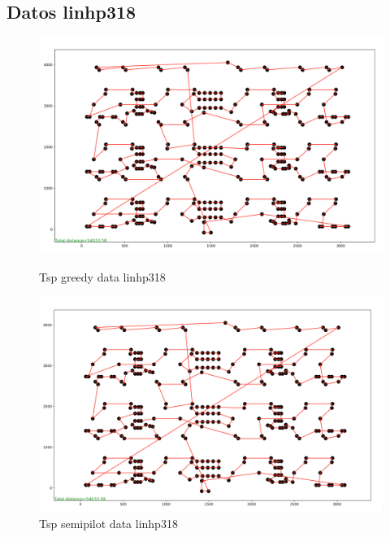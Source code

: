 \documentclass{article}
\begin{document}
\subsection{Datos linhp318}

\begin{figure}[H]
	\begin{minipage}{0.5\textwidth}
		\centering
		\includegraphics[width=1\textwidth]{../image/greedy/greedy-linhp318.png}
		\caption{\label{fig:Figura1} Tsp greedy data linhp318}
	\end{minipage}\hfill
	\begin {minipage}{0.5\textwidth}
		\centering
		\includegraphics[width=1\textwidth]{../image/semipilot/semipilot-linhp318-2-2.png}
		\caption{\label{fig:Figura1} Tsp semipilot data linhp318}
	\end{minipage}
\end{figure}
\end{document}
